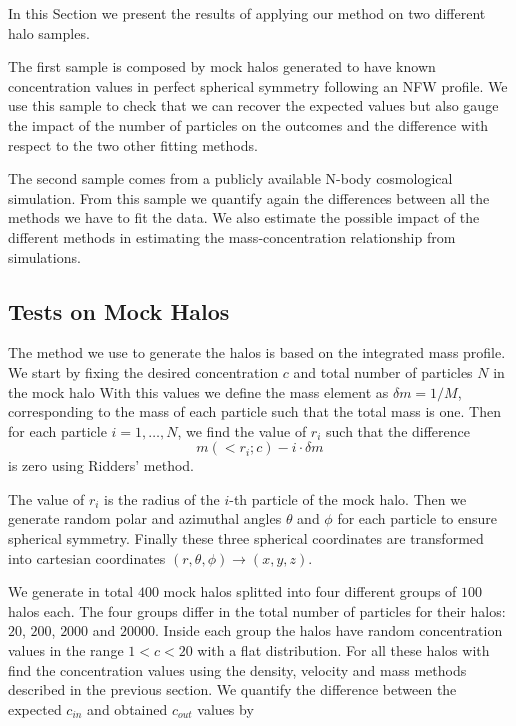 \documentclass[useAMS,usenatbib]{mn2e}
\begin{document}
In this Section we present the results of applying our method on two
different halo samples.

The first sample is composed by mock halos generated to have known
concentration values in perfect spherical symmetry following an NFW
profile.
We use this sample to check that we can recover the expected values
but also gauge the impact of the number of particles on the outcomes
and the difference with respect to the two other fitting methods.


The second sample comes from a publicly available N-body cosmological
simulation.
From this sample we quantify again the differences between all the
methods we have to fit the data.
We also estimate the possible impact of the different methods in
estimating the mass-concentration relationship from simulations.

\subsection{Tests on Mock Halos}

The method we use to generate the halos is based on the integrated
mass profile.
We start by fixing the desired concentration $c$ and total number of
particles $N$ in the mock halo
With this values we define the mass element as $\delta m = 1/M$, corresponding
to the mass of each particle such that the total mass is one.
Then for each particle $i=1,\ldots,N$, we find the value of $r_i$ such that
the difference
%
\begin{equation}
m(<r_i;c) - i \cdot \delta m
\end{equation}
%
is zero using Ridders' method.

The value of $r_i$ is the radius of the $i$-th particle of the mock
halo.
Then we generate random polar and azimuthal angles $\theta$ and $\phi$
for each particle to ensure spherical symmetry.
Finally these three spherical coordinates are transformed into cartesian coordinates
$(r,\theta,\phi) \rightarrow (x,y,z)$.



We generate in total $400$ mock halos splitted into four different
groups of $100$ halos each.
The four groups differ in the total number of particles for their halos:
$20$, $200$, $2000$ and $20000$.
Inside each group the halos have random concentration values in
the range $1<c<20$ with a flat distribution.
For all these halos with find the concentration values using the
density, velocity and mass methods described in the previous
section. We quantify the difference between the expected $c_{in}$
and obtained $c_{out}$ values by
\end{document}

